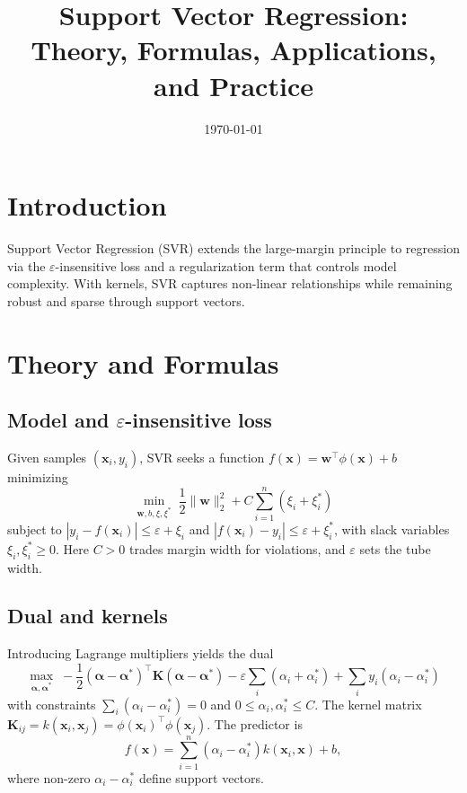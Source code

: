 \documentclass{article}
\title{Support Vector Regression: Theory, Formulas, Applications, and Practice}
\author{}
\date{\today}
\begin{document}
\maketitle
\tableofcontents

\section{Introduction}
Support Vector Regression (SVR) extends the large-margin principle to regression via the \(\varepsilon\)-insensitive loss and a regularization term that controls model complexity. With kernels, SVR captures non-linear relationships while remaining robust and sparse through support vectors.

\section{Theory and Formulas}
\subsection{Model and \(\varepsilon\)-insensitive loss}
Given samples \((\mathbf{x}_i,y_i)\), SVR seeks a function \(f(\mathbf{x})=\mathbf{w}^\top\phi(\mathbf{x})+b\) minimizing
\begin{equation}
\min_{\mathbf{w},b,\xi,\xi^*} \; \frac{1}{2}\lVert\mathbf{w}\rVert_2^2 + C\sum_{i=1}^n (\xi_i+\xi^*_i)
\end{equation}
subject to \(|y_i - f(\mathbf{x}_i)| \le \varepsilon + \xi_i\) and \(|f(\mathbf{x}_i)-y_i| \le \varepsilon + \xi_i^*\), with slack variables \(\xi_i,\xi_i^*\ge 0\). Here \(C>0\) trades margin width for violations, and \(\varepsilon\) sets the tube width.

\subsection{Dual and kernels}
Introducing Lagrange multipliers yields the dual
\begin{equation}
\max_{\bm{\alpha},\bm{\alpha}^*} \; -\frac{1}{2}(\bm{\alpha}-\bm{\alpha}^*)^\top \mathbf{K}(\bm{\alpha}-\bm{\alpha}^*) - \varepsilon \sum_i (\alpha_i+\alpha_i^*) + \sum_i y_i(\alpha_i-\alpha_i^*)
\end{equation}
with constraints \(\sum_i (\alpha_i-\alpha_i^*)=0\) and \(0\le \alpha_i,\alpha_i^*\le C\). The kernel matrix \(\mathbf{K}_{ij}=k(\mathbf{x}_i,\mathbf{x}_j)=\phi(\mathbf{x}_i)^\top\phi(\mathbf{x}_j)\). The predictor is
\begin{equation}
f(\mathbf{x}) = \sum_{i=1}^n (\alpha_i-\alpha_i^*) k(\mathbf{x}_i,\mathbf{x}) + b,
\end{equation}
where non-zero \(\alpha_i-\alpha_i^*\) define support vectors.
\end{document}
